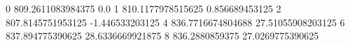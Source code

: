 0 809.2611083984375 0.0
1 810.1177978515625 0.856689453125
2 807.8145751953125 -1.446533203125
4 836.7716674804688 27.51055908203125
6 837.894775390625 28.6336669921875
8 836.2880859375 27.0269775390625
